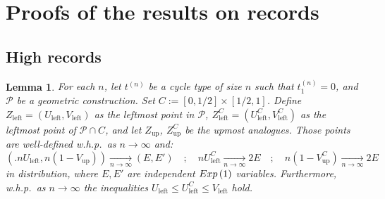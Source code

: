 \documentclass{article}
\newtheorem{lem}[theorem]{Lemma}
\theoremstyle{remark}
\newcommand{\cv}[2]{\underset{#1\to#2}{\longrightarrow}}
\newcommand{\Exp}[1]{{\rm Exp}\left(#1\right)}
\def\pts{\mathcal{P}}
\begin{document}
\section{Proofs of the results on records}
\label{sec: proof records}

\subsection{High records}

\begin{lem}\label{lem: leftmost and upmost points in t-cyclic}
    For each $n$, let $t^{(n)}$ be a cycle type of size $n$ such that $t_1^{(n)}=0$, and $\pts$ be a geometric construction.
    Set $C := [0,1/2]\times[1/2,1]$.
    Define $Z_\text{left} = \left(U_\text{left},V_\text{left}\right)$ as the leftmost point in $\pts$, $Z_\text{left}^C = \left(U_\text{left}^C,V_\text{left}^C\right)$ as the leftmost point of $\pts\cap C$, and let $Z_\text{up}$, $Z_\text{up}^C$ be the upmost analogues.
    Those points are well-defined w.h.p.~as $n\to\infty$ and:
    \begin{equation*}
        \left(\big. nU_\text{left} , n\left(1-V_\text{up}\right) \right) \cv{n}{\infty} \left(E,E'\right)
        \quad;\quad
        n U_\text{left}^C \cv{n}{\infty} 2E
        \quad;\quad
        n \left(1-V_\text{up}^C\right) \cv{n}{\infty} 2E
    \end{equation*}
    in distribution, where $E,E'$ are independent $\Exp{1}$ variables.
    Furthermore, w.h.p.~as $n\to\infty$ the inequalities $U_\text{left} \le U_\text{left}^C \le V_\text{left}$ hold.
\end{lem}
\end{document}
